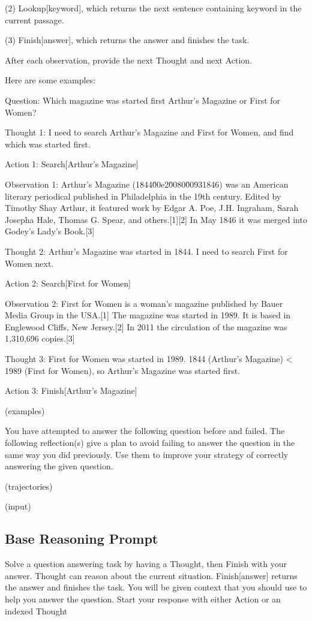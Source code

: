 \documentclass{article} \usepackage{iclr2024_conference,times}
\begin{document}
(2) Lookup[keyword], which returns the next sentence containing keyword in the current passage.

(3) Finish[answer], which returns the answer and finishes the task.

After each observation, provide the next Thought and next Action. 

Here are some examples:

Question: Which magazine was started first Arthur's Magazine or First for Women?

Thought 1: I need to search Arthur's Magazine and First for Women, and find which was started first.

Action 1: Search[Arthur's Magazine]

Observation 1: Arthur's Magazine (1844\u00e2\u0080\u00931846) was an American literary periodical published in Philadelphia in the 19th century. Edited by Timothy Shay Arthur, it featured work by Edgar A. Poe, J.H. Ingraham, Sarah Josepha Hale, Thomas G. Spear, and others.[1][2] In May 1846 it was merged into Godey's Lady's Book.[3]

Thought 2: Arthur's Magazine was started in 1844. I need to search First for Women next.

Action 2: Search[First for Women]

Observation 2: First for Women is a woman's magazine published by Bauer Media Group in the USA.[1] The magazine was started in 1989. It is based in Englewood Cliffs, New Jersey.[2] In 2011 the circulation of the magazine was 1,310,696 copies.[3]

Thought 3: First for Women was started in 1989. 1844 (Arthur's Magazine) < 1989 (First for Women), so Arthur's Magazine was started first.

Action 3: Finish[Arthur's Magazine]

(examples)

You have attempted to answer the following question before and failed. The following reflection(s) give a plan to avoid failing to answer the question in the same way you did previously. Use them to improve your strategy of correctly answering the given question.

(trajectories)

(input)

\subsection{Base Reasoning Prompt}

Solve a question answering task by having a Thought, then Finish with your answer. Thought can reason about the current situation. Finish[answer] returns the answer and finishes the task. You will be given context that you should use to help you answer the question. Start your response with either Action or an indexed Thought
\end{document}
